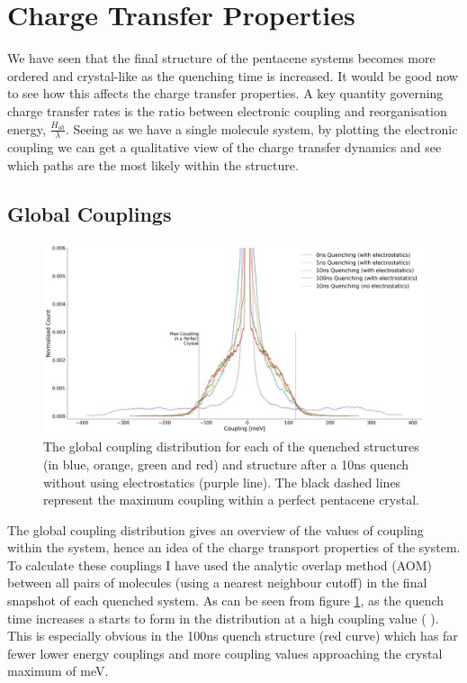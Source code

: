 \section{Charge Transfer Properties}
We have seen that the final structure of the pentacene systems becomes more ordered and crystal-like as the quenching time is increased. It would be good now to see how this affects the charge transfer properties. A key quantity governing charge transfer rates is the ratio between electronic coupling and reorganisation energy, $\frac{H_{ab}}{\lambda}$. Seeing as we have a single molecule system, by plotting the electronic coupling we can get a qualitative view of the charge transfer dynamics and see which paths are the most likely within the structure.
\subsection{Global Couplings}
\label{sect:GlobCoup}
\begin{figure}[ht]
	\includegraphics[width=\textwidth]{../img/DifferentQuenchTimes/GlobalCouplings.png}
	\caption{\label{fig:glob_coup}The global coupling distribution for each of the quenched structures (in blue, orange, green and red) and  structure after a 10ns quench without using electrostatics (purple line). The black dashed lines represent the maximum coupling within a perfect pentacene crystal.}
\end{figure}
\noindent The global coupling distribution gives an overview of the values of coupling within the system, hence an idea of the charge transport properties of the system. To calculate these couplings I have used the analytic overlap method (AOM)\cite{gajdos_ultrafast_2014} between all pairs of molecules (using a nearest neighbour cutoff) in the final snapshot of each quenched system. As can be seen from figure \ref{fig:glob_coup}, as the quench time increases a  starts to form in the distribution at a high coupling value ( ). This is especially obvious in the 100ns quench structure (red curve) which has far fewer lower energy couplings and more coupling values approaching the crystal maximum of  meV.

